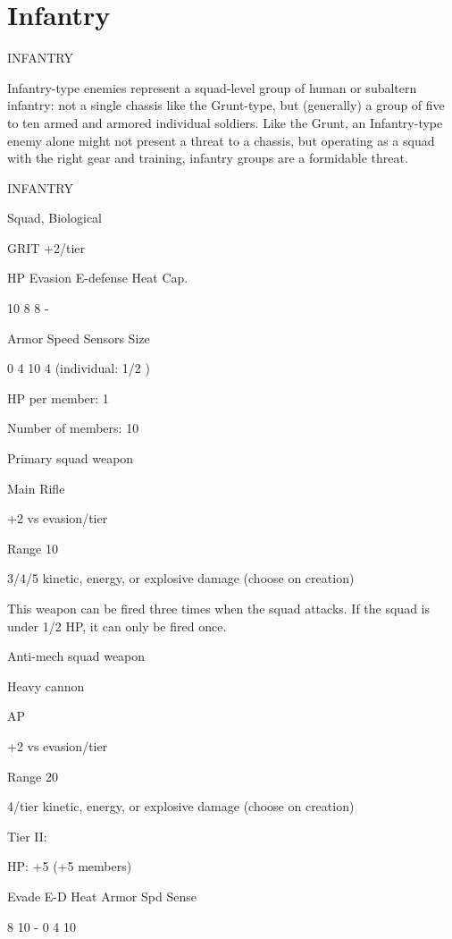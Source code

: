 \section{Infantry}
                                               INFANTRY

Infantry-type enemies represent a squad-level group of human or subaltern infantry: not a single
chassis like the Grunt-type, but (generally) a group of five to ten armed and armored individual
soldiers. Like the Grunt, an Infantry-type enemy alone might not present a threat to a chassis, but
operating as a squad with the right gear and training, infantry groups are a formidable threat.

       INFANTRY

       Squad, Biological

       GRIT +2/tier

       HP         Evasion      E-defense     Heat Cap.

       10         8            8             -

       Armor      Speed       Sensors        Size

       0          4            10            4 (individual:
                                             1/2 )

HP per member: 1

Number of members: 10


Primary squad weapon

Main Rifle

+2 vs evasion/tier

Range 10

3/4/5 kinetic, energy, or explosive damage (choose on creation)

This weapon can be fired three times when the squad attacks. If the squad is under 1/2 HP, it can
only be fired once.


Anti-mech squad weapon

Heavy cannon

AP

+2 vs evasion/tier

Range 20

4/tier kinetic, energy, or explosive damage (choose on creation)


Tier II:

HP: +5 (+5 members)


       Evade    E-D    Heat    Armor       Spd      Sense




        8         10     -        0            4         10

